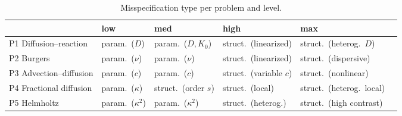 \documentclass[11pt]{article}
\begin{document}
\begin{table}[h]
\centering
\begin{tabular}{@{}llllll@{}}
\toprule
& \textsf{low} & \textsf{med} & \textsf{high} & \textsf{max}\\
\midrule
P1 Diffusion--reaction & param.\ ($D$) & param.\ ($D,K_0$) & struct.\ (linearized) & struct.\ (heterog.\ $D$)\\
P2 Burgers & param.\ ($\nu$) & param.\ ($\nu$) & struct.\ (linearized) & struct.\ (dispersive)\\
P3 Advection--diffusion & param.\ ($c$) & param.\ ($c$) & struct.\ (variable $c$) & struct.\ (nonlinear)\\
P4 Fractional diffusion & param.\ ($\kappa$) & struct.\ (order $s$) & struct.\ (local) & struct.\ (heterog.\ local)\\
P5 Helmholtz & param.\ ($\kappa^2$) & param.\ ($\kappa^2$) & struct.\ (heterog.) & struct.\ (high contrast)\\
\bottomrule
\end{tabular}
\caption{Misspecification type per problem and level.}
\label{tab:taxonomy}
\end{table}
\end{document}
